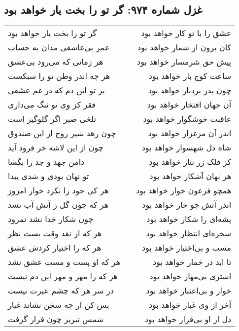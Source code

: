 \begin{center}
\section*{غزل شماره ۹۷۴: گر تو را بخت یار خواهد بود}
\label{sec:0974}
\begin{longtable}{l p{0.5cm} r}
گر تو را بخت یار خواهد بود
&&
عشق را با تو کار خواهد بود
\\
عمر بی‌عاشقی مدان به حساب
&&
کان برون از شمار خواهد بود
\\
هر زمانی که می‌رود بی‌عشق
&&
پیش حق شرمسار خواهد بود
\\
هر چه اندر وطن تو را سبکست
&&
ساعت کوچ بار خواهد بود
\\
بر تو این دم که در غم عشقی
&&
چون پدر بردبار خواهد بود
\\
فقر کز وی تو ننگ می‌داری
&&
آن جهان افتخار خواهد بود
\\
تلخی صبر اگر گلوگیر است
&&
عاقبت خوشگوار خواهد بود
\\
چون رهد شیر روح از این صندوق
&&
اندر آن مرغزار خواهد بود
\\
چون از این لاشه خر فرود آید
&&
شاه دل شهسوار خواهد بود
\\
دامن جهد و جد را بگشا
&&
کز فلک زر نثار خواهد بود
\\
تو نهان بودی و شدی پیدا
&&
هر نهان آشکار خواهد بود
\\
هر کی خود را نکرد خوار امروز
&&
همچو فرعون خوار خواهد بود
\\
هر که چون گل ز آتش آب نشد
&&
اندر آتش چو خار خواهد بود
\\
چون شکار خدا نشد نمرود
&&
پشه‌ای را شکار خواهد بود
\\
هر که از نقد وقت بست نظر
&&
سخره‌ای انتظار خواهد بود
\\
هر که را اختیار کردش عشق
&&
مست و بی‌اختیار خواهد بود
\\
هر که او پست و مست عشق نشد
&&
تا ابد در خمار خواهد بود
\\
هر که را مهر و مهر این دم نیست
&&
اشتری بی‌مهار خواهد بود
\\
در سر هر که چشم عبرت نیست
&&
خوار و بی‌اعتبار خواهد بود
\\
بس کن ار چه سخن نشاند غبار
&&
آخر از وی غبار خواهد بود
\\
شمس تبریز چون قرار گرفت
&&
دل از او بی‌قرار خواهد بود
\\
\end{longtable}
\end{center}
